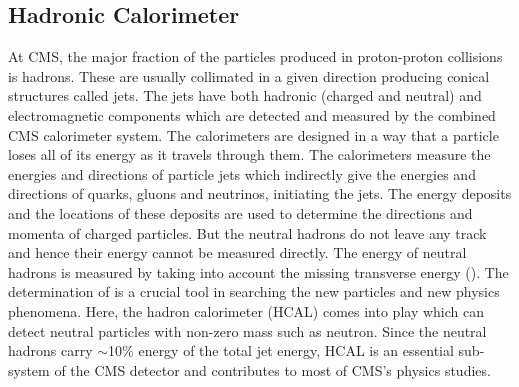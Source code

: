 \subsection{Hadronic Calorimeter}
At CMS, the major fraction of the particles produced in proton-proton collisions is hadrons. These are usually collimated in a given direction producing conical structures called jets. The jets have both hadronic (charged and neutral) and electromagnetic components which are detected and measured by the combined CMS calorimeter system. The calorimeters are designed in a way that a particle loses all of its energy as it travels through them. The calorimeters measure the energies and directions of particle jets which indirectly give the energies and directions of quarks, gluons and neutrinos, initiating the jets. The energy deposits and the locations of these deposits are used to determine the directions and momenta of charged particles. But the neutral hadrons do not leave any track and hence their energy cannot be measured directly. The energy of neutral hadrons is measured by taking into account the missing transverse energy (\ETmiss). The determination of \ETmiss is a crucial tool in searching the new particles and new physics phenomena. Here, the hadron calorimeter (HCAL) comes into play which can detect neutral particles with non-zero mass such as neutron. Since the neutral hadrons carry $\sim$10\% energy of the total jet energy, HCAL is an essential sub-system of the CMS detector and contributes to most of CMS's physics studies.

